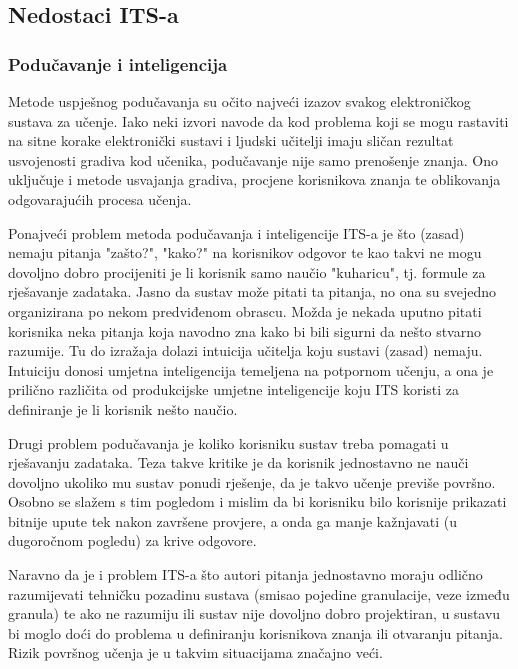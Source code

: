 \documentclass[times, utf8, zavrsni, numeric]{fer}
\begin{document}
\pagebreak

\subsection{Nedostaci ITS-a}

\subsubsection{Podučavanje i inteligencija}
Metode uspješnog podučavanja su očito najveći izazov svakog elektroničkog sustava za učenje. Iako neki izvori navode da kod problema koji se mogu rastaviti na sitne korake elektronički sustavi i ljudski učitelji imaju sličan rezultat usvojenosti gradiva kod učenika, podučavanje nije samo prenošenje znanja. Ono uključuje i metode usvajanja gradiva, procjene korisnikova znanja te oblikovanja odgovarajućih procesa učenja.
\par
Ponajveći problem metoda podučavanja i inteligencije ITS-a je što (zasad) nemaju pitanja "zašto?", "kako?" na korisnikov odgovor te kao takvi ne mogu dovoljno dobro procijeniti je li korisnik samo naučio "kuharicu", tj. formule za rješavanje zadataka. Jasno da sustav može pitati ta pitanja, no ona su svejedno organizirana po nekom predviđenom obrascu. Možda je nekada uputno pitati korisnika neka pitanja koja navodno zna kako bi bili sigurni da nešto stvarno razumije. Tu do izražaja dolazi intuicija učitelja koju sustavi (zasad) nemaju. Intuiciju donosi umjetna inteligencija temeljena na potpornom učenju, a ona je prilično različita od produkcijske umjetne inteligencije koju ITS koristi za definiranje je li korisnik nešto naučio.
\par
Drugi problem podučavanja je koliko korisniku sustav treba pomagati u rješavanju zadataka. Teza takve kritike je da korisnik jednostavno ne nauči dovoljno ukoliko mu sustav ponudi rješenje, da je takvo učenje previše površno. Osobno se slažem s tim pogledom i mislim da bi korisniku bilo korisnije prikazati bitnije upute tek nakon završene provjere, a onda ga manje kažnjavati (u dugoročnom pogledu) za krive odgovore.\cite{limitations}
\par
Naravno da je i problem ITS-a što autori pitanja jednostavno moraju odlično razumijevati tehničku pozadinu sustava (smisao pojedine granulacije, veze između granula) te ako ne razumiju ili sustav nije dovoljno dobro projektiran, u sustavu bi moglo doći do problema u definiranju korisnikova znanja ili otvaranju pitanja. Rizik površnog učenja je u takvim situacijama značajno veći.
\end{document}

